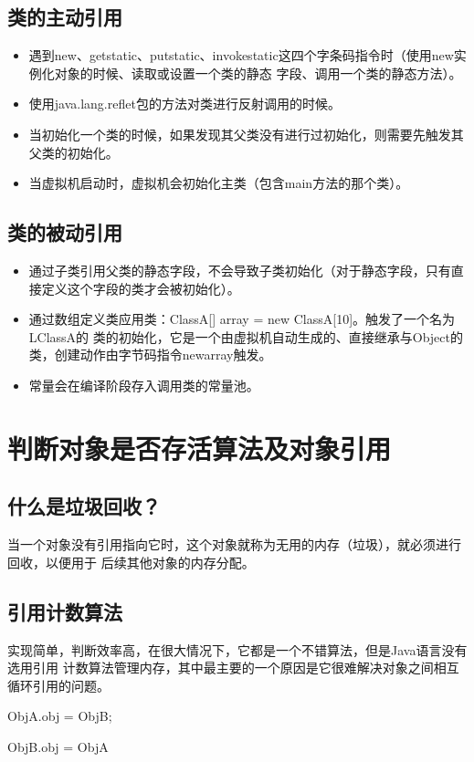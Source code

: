 \subsection{类的主动引用}
\begin{itemize}
	\item 遇到new、getstatic、putstatic、invokestatic这四个字条码指令时（使用new实例化对象的时候、读取或设置一个类的静态
	字段、调用一个类的静态方法）。
	\item 使用java.lang.reflet包的方法对类进行反射调用的时候。
	\item 当初始化一个类的时候，如果发现其父类没有进行过初始化，则需要先触发其父类的初始化。
	\item 当虚拟机启动时，虚拟机会初始化主类（包含main方法的那个类）。
\end{itemize}
\subsection{类的被动引用}
\begin{itemize}
	\item 通过子类引用父类的静态字段，不会导致子类初始化（对于静态字段，只有直接定义这个字段的类才会被初始化）。
	\item 通过数组定义类应用类：ClassA[] array = new ClassA[10]。触发了一个名为LClassA的
	类的初始化，它是一个由虚拟机自动生成的、直接继承与Object的类，创建动作由字节码指令newarray触发。
	\item 常量会在编译阶段存入调用类的常量池。
\end{itemize}
\section{判断对象是否存活算法及对象引用}
\subsection{什么是垃圾回收？}
当一个对象没有引用指向它时，这个对象就称为无用的内存（垃圾），就必须进行回收，以便用于
后续其他对象的内存分配。
\subsection{引用计数算法}
实现简单，判断效率高，在很大情况下，它都是一个不错算法，但是Java语言没有选用引用
计数算法管理内存，其中最主要的一个原因是它很难解决对象之间相互循环引用的问题。
\par ObjA.obj = ObjB;
\par ObjB.obj = ObjA
